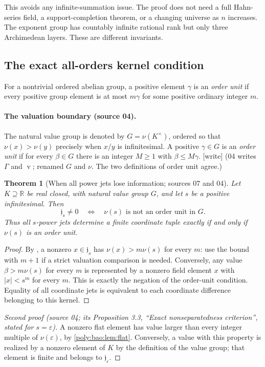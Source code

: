 \documentclass[11pt,a4paper]{article}
\numberwithin{equation}{section}
\newtheorem{theorem}{Theorem}[section]
\theoremstyle{plain}
\newcommand{\wtag}{\textup{[write]}}%
\newcommand{\R}{\mathbb R}
\newcommand{\eps}{\varepsilon}
\renewcommand{\vv}{\operatorname{v}}%
\newcommand{\JJ}{\mathfrak j}
\begin{document}
This avoids any infinite-summation issue. The proof does not need a full
Hahn-series field, a support-completion theorem, or a changing universe
as $n$ increases. The exponent group has countably infinite rational
rank but only three Archimedean layers. These are different invariants.

\subsection{The exact all-orders kernel condition}
For a nontrivial ordered abelian group, a positive element $\gamma$ is
an \emph{order unit} if every positive group element is at most
$m\gamma$ for some positive ordinary integer $m$.

\paragraph{The valuation boundary (source 04).}
The natural value group is denoted by $G=\nu(K^\times)$, ordered so
that $\nu(x)>\nu(y)$ precisely when $x/y$ is infinitesimal. A positive
$\gamma\in G$ is an \emph{order unit} if for every $\beta\in G$
there is an integer $M\geq1$ with $\beta\leq M\gamma$.
\wtag{} (04 writes $\Gamma$ and $\vv$; renamed $G$ and $\nu$. The two
definitions of order unit agree.)

\begin{theorem}[When all power jets lose information; sources 07 and 04]\label{poly:ic:thm:orderunit}\label{poly:bao:prop:orderunit}
Let $K\supseteq\R$ be real closed, with natural value group $G$, and let
$s$ be a positive infinitesimal. Then
\begin{equation}\label{poly:ic:eq:orderunit}
 \JJ_s\ne0
 \quad\Longleftrightarrow\quad
 \nu(s)\text{ is not an order unit in }G.
\end{equation}
Thus all $s$-power jets determine a finite coordinate tuple exactly
if and only if $\nu(s)$ is an order unit.
\end{theorem}
\begin{proof}
By , a nonzero $x\in\JJ_s$ has
$\nu(x)>m\nu(s)$ for every $m$: use the bound with $m+1$ if a strict
valuation comparison is needed. Conversely, any value
$\beta>m\nu(s)$ for every $m$ is represented by a nonzero field element
$x$ with $|x|<s^m$ for every $m$. This is exactly the negation of the
order-unit condition. Equality of all coordinate jets is equivalent to
each coordinate difference belonging to this kernel.
\end{proof}
\begin{proof}[Second proof (source 04; its Proposition 3.3, ``Exact nonseparatedness criterion'', stated for $s=\eps$)]
A nonzero flat element has value larger than every integer multiple of
$\nu(\eps)$, by \cref{poly:bao:lem:flat}. Conversely, a value with this property is
realized by a nonzero element of $K$ by the definition of the value group;
that element is finite and belongs to $\JJ_\eps$.
\end{proof}
\end{document}
